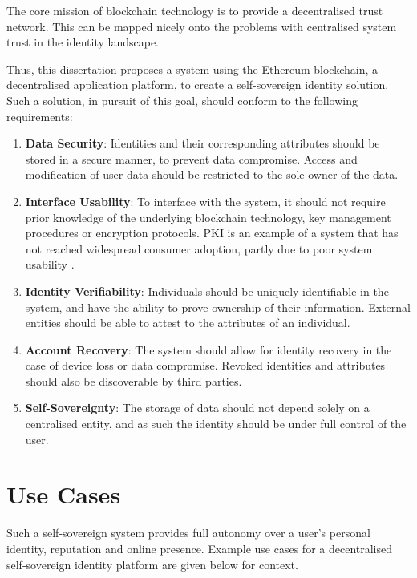 The core mission of blockchain technology is to provide a decentralised trust network. This can be mapped nicely onto the problems with centralised system trust in the identity landscape.

Thus, this dissertation proposes a system using the Ethereum blockchain, a decentralised application platform, to create a self-sovereign identity solution. Such a solution, in pursuit of this goal, should conform to the following requirements:

\begin{enumerate}
  \item \textbf{Data Security}: Identities and their corresponding attributes should be stored in a secure manner, to prevent data compromise. Access and modification of user data should be restricted to the sole owner of the data.
  \item \textbf{Interface Usability}: To interface with the system, it should not require prior knowledge of the underlying blockchain technology, key management procedures or encryption protocols. \ac{PKI} is an example of a system that has not reached widespread consumer adoption, partly due to poor system usability \cite{straub_usability_2006}.
  \item \textbf{Identity Verifiability}: Individuals should be uniquely identifiable in the system, and have the ability to prove ownership of their information. External entities should be able to attest to the attributes of an individual.
  \item \textbf{Account Recovery}: The system should allow for identity recovery in the case of device loss or data compromise. Revoked identities and attributes should also be discoverable by third parties.
  \item \textbf{Self-Sovereignty}: The storage of data should not depend solely on a centralised entity, and as such the identity should be under full control of the user.
\end{enumerate}

\section{Use Cases}
Such a self-sovereign system provides full autonomy over a user's personal identity, reputation and online presence. Example use cases for a decentralised self-sovereign identity platform are given below for context.


